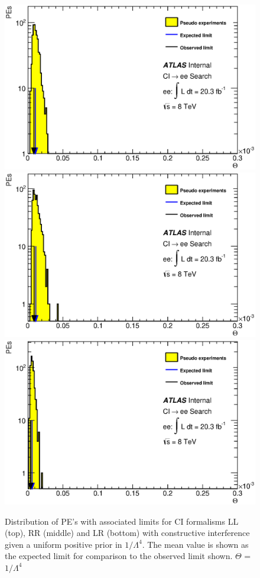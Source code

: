     \begin{figure}[h]
        \begin{center}
            \includegraphics[width=0.7\linewidth]{images/ee__LL_minus_L4/Theta.eps}
            \includegraphics[width=0.7\linewidth]{images/ee__RR_minus_L4/Theta.eps}
            \includegraphics[width=0.7\linewidth]{images/ee__LR_minus_L4/Theta.eps}
        \end{center}
       \caption{Distribution of PE's with associated limits for CI formalisms LL (top), RR (middle) and LR (bottom) with constructive interference given a uniform positive prior in $1/\Lambda^{4}$. The mean value is shown as the expected limit for comparison to the observed limit shown. $\Theta$ = $1/\Lambda^{4}$}
       \label{fig:Theta_CI_con_4}
    \end{figure}


